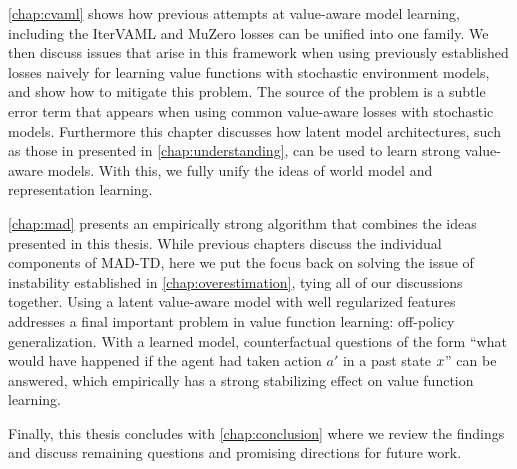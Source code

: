 \autoref{chap:cvaml} shows how previous attempts at value-aware model learning, including the IterVAML \parencite{itervaml} and MuZero \parencite{schrittwieser2020mastering} losses can be unified into one family. 
We then discuss issues that arise in this framework when using previously established losses naively for learning value functions with stochastic environment models, and show how to mitigate this problem.
The source of the problem is a subtle error term that appears when using common value-aware losses with stochastic models.
Furthermore this chapter discusses how latent model architectures, such as those in presented in \autoref{chap:understanding}, can be used to learn strong value-aware models.
With this, we fully unify the ideas of world model and representation learning.

\autoref{chap:mad} presents an empirically strong algorithm that combines the ideas presented in this thesis.
While previous chapters discuss the individual components of MAD-TD, here we put the focus back on solving the issue of instability established in \autoref{chap:overestimation}, tying all of our discussions together.
Using a latent value-aware model with well regularized features addresses a final important problem in value function learning: off-policy generalization.
With a learned model, counterfactual questions of the form ``what would have happened if the agent had taken action $a'$ in a past state $x$'' can be answered, which empirically has a strong stabilizing effect on value function learning.

Finally, this thesis concludes with \autoref{chap:conclusion} where we review the findings and discuss remaining questions and promising directions for future work.


